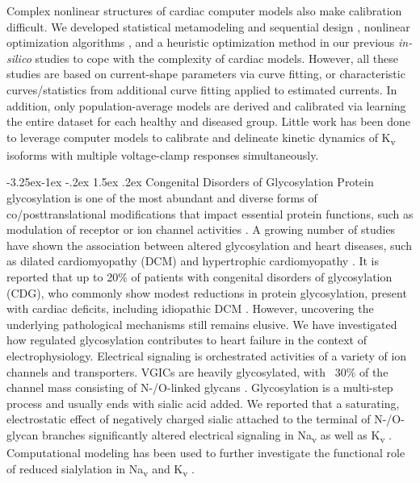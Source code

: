 \documentclass[11pt]{article}
\makeatletter
\renewcommand\subsection{\@startsection{subsection}{2}{\z@}%
                                     {-3.25ex\@plus -1ex \@minus -.2ex}%
                                     {1.5ex \@plus .2ex}%
                                     {\normalfont\fontfamily{phv}\fontsize{14}{17}\bfseries}}
\makeatother
\begin{document}
Complex nonlinear structures of cardiac computer models also make calibration difficult. We developed statistical metamodeling and sequential design \citep{du2015statistical}, nonlinear optimization algorithms \citep{du2013silico,du2017silico}, and a heuristic optimization method \citep{kim2022simulation} in our previous \textit{in-silico} studies to cope with the complexity of cardiac models. However, all these studies are based on current-shape parameters via curve fitting, or characteristic curves/statistics from additional curve fitting applied to estimated currents. In addition, only population-average models are derived and calibrated via learning the entire dataset for each healthy and diseased group. Little work has been done to leverage computer models to calibrate and delineate kinetic dynamics of K\textsubscript{v} isoforms with multiple voltage-clamp responses simultaneously.

\subsection{Congenital Disorders of Glycosylation}
Protein glycosylation is one of the most abundant and diverse forms of co/posttranslational modifications that impact essential protein functions, such as modulation of receptor or ion channel activities \citep{ohtsubo2006glycosylation,ednie2012modulation}. A growing number of studies have shown the association between altered glycosylation and heart diseases, such as dilated cardiomyopathy (DCM) and hypertrophic cardiomyopathy \citep{ednie2019reduced2,ohtsubo2006glycosylation}. It is reported that up to 20\% of patients with congenital disorders of glycosylation (CDG), who commonly show modest reductions in protein glycosylation, present with cardiac deficits, including idiopathic DCM \citep{marques2017cardiac}. However, uncovering the underlying pathological mechanisms still remains elusive. We have investigated how regulated glycosylation contributes to heart failure in the context of electrophysiology. Electrical signaling is orchestrated activities of a variety of ion channels and transporters. VGICs are heavily glycosylated, with ~30\% of the channel mass consisting of N-/O-linked glycans \citep{ednie2012modulation}. Glycosylation is a multi-step process and usually ends with sialic acid added. We reported that a saturating, electrostatic effect of negatively charged sialic attached to the terminal of N-/O-glycan branches significantly altered electrical signaling in Na\textsubscript{v} \citep{ednie2013sialicNav1,ednie2015sialicNav2} as well as K\textsubscript{v} \citep{ednie2015sialicKv}. Computational modeling has been used to further investigate the functional role of reduced sialylation in Na\textsubscript{v} and K\textsubscript{v} \citep{du2015statistical, du2017silico}.
\end{document}

